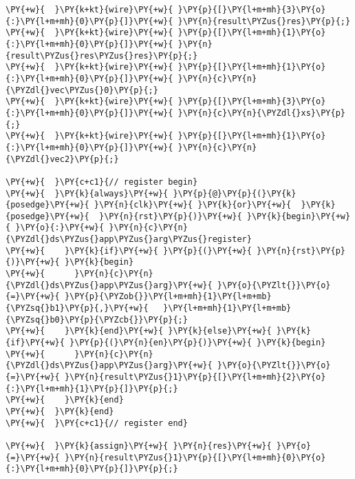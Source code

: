 {\begin{Verbatim}[commandchars=\\\{\}]
\PY{+w}{  }\PY{k+kt}{wire}\PY{+w}{ }\PY{p}{[}\PY{l+m+mh}{3}\PY{o}{:}\PY{l+m+mh}{0}\PY{p}{]}\PY{+w}{ }\PY{n}{result\PYZus{}res}\PY{p}{;}
\PY{+w}{  }\PY{k+kt}{wire}\PY{+w}{ }\PY{p}{[}\PY{l+m+mh}{1}\PY{o}{:}\PY{l+m+mh}{0}\PY{p}{]}\PY{+w}{ }\PY{n}{result\PYZus{}res\PYZus{}res}\PY{p}{;}
\PY{+w}{  }\PY{k+kt}{wire}\PY{+w}{ }\PY{p}{[}\PY{l+m+mh}{1}\PY{o}{:}\PY{l+m+mh}{0}\PY{p}{]}\PY{+w}{ }\PY{n}{c}\PY{n}{\PYZdl{}vec\PYZus{}0}\PY{p}{;}
\PY{+w}{  }\PY{k+kt}{wire}\PY{+w}{ }\PY{p}{[}\PY{l+m+mh}{3}\PY{o}{:}\PY{l+m+mh}{0}\PY{p}{]}\PY{+w}{ }\PY{n}{c}\PY{n}{\PYZdl{}xs}\PY{p}{;}
\PY{+w}{  }\PY{k+kt}{wire}\PY{+w}{ }\PY{p}{[}\PY{l+m+mh}{1}\PY{o}{:}\PY{l+m+mh}{0}\PY{p}{]}\PY{+w}{ }\PY{n}{c}\PY{n}{\PYZdl{}vec2}\PY{p}{;}

\PY{+w}{  }\PY{c+c1}{// register begin}
\PY{+w}{  }\PY{k}{always}\PY{+w}{ }\PY{p}{@}\PY{p}{(}\PY{k}{posedge}\PY{+w}{ }\PY{n}{clk}\PY{+w}{ }\PY{k}{or}\PY{+w}{  }\PY{k}{posedge}\PY{+w}{  }\PY{n}{rst}\PY{p}{)}\PY{+w}{ }\PY{k}{begin}\PY{+w}{ }\PY{o}{:}\PY{+w}{ }\PY{n}{c}\PY{n}{\PYZdl{}ds\PYZus{}app\PYZus{}arg\PYZus{}register}
\PY{+w}{    }\PY{k}{if}\PY{+w}{ }\PY{p}{(}\PY{+w}{ }\PY{n}{rst}\PY{p}{)}\PY{+w}{ }\PY{k}{begin}
\PY{+w}{      }\PY{n}{c}\PY{n}{\PYZdl{}ds\PYZus{}app\PYZus{}arg}\PY{+w}{ }\PY{o}{\PYZlt{}}\PY{o}{=}\PY{+w}{ }\PY{p}{\PYZob{}}\PY{l+m+mh}{1}\PY{l+m+mb}{\PYZsq{}b1}\PY{p}{,}\PY{+w}{   }\PY{l+m+mh}{1}\PY{l+m+mb}{\PYZsq{}b0}\PY{p}{\PYZcb{}}\PY{p}{;}
\PY{+w}{    }\PY{k}{end}\PY{+w}{ }\PY{k}{else}\PY{+w}{ }\PY{k}{if}\PY{+w}{ }\PY{p}{(}\PY{n}{en}\PY{p}{)}\PY{+w}{ }\PY{k}{begin}
\PY{+w}{      }\PY{n}{c}\PY{n}{\PYZdl{}ds\PYZus{}app\PYZus{}arg}\PY{+w}{ }\PY{o}{\PYZlt{}}\PY{o}{=}\PY{+w}{ }\PY{n}{result\PYZus{}1}\PY{p}{[}\PY{l+m+mh}{2}\PY{o}{:}\PY{l+m+mh}{1}\PY{p}{]}\PY{p}{;}
\PY{+w}{    }\PY{k}{end}
\PY{+w}{  }\PY{k}{end}
\PY{+w}{  }\PY{c+c1}{// register end}

\PY{+w}{  }\PY{k}{assign}\PY{+w}{ }\PY{n}{res}\PY{+w}{ }\PY{o}{=}\PY{+w}{ }\PY{n}{result\PYZus{}1}\PY{p}{[}\PY{l+m+mh}{0}\PY{o}{:}\PY{l+m+mh}{0}\PY{p}{]}\PY{p}{;}


\end{Verbatim}}
